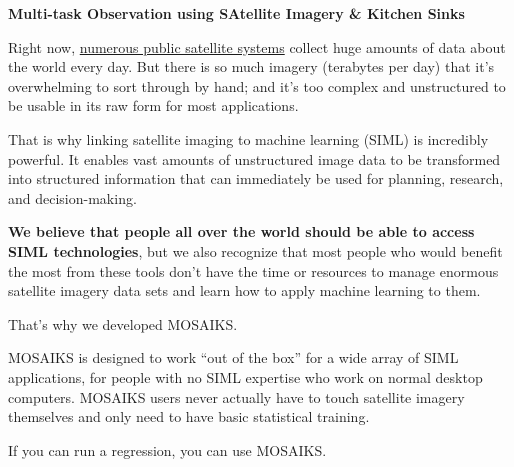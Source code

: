 \documentclass[
  letterpaper,
  DIV=11,
  numbers=noendperiod]{scrreprt}
\begin{document}
\begin{tcolorbox}[enhanced jigsaw, bottomtitle=1mm, rightrule=.15mm, coltitle=black, titlerule=0mm, toprule=.15mm, breakable, bottomrule=.15mm, left=2mm, leftrule=.75mm, opacitybacktitle=0.6, colbacktitle=quarto-callout-tip-color!10!white, arc=.35mm, opacityback=0, title=\textcolor{quarto-callout-tip-color}{\faLightbulb}\hspace{0.5em}{MOSAIKS}, toptitle=1mm, colback=white, colframe=quarto-callout-tip-color-frame]

\textbf{Multi-task Observation using SAtellite Imagery \& Kitchen Sinks}

\end{tcolorbox}

Right now,
\href{https://www.ucsusa.org/resources/satellite-database\#.VF_jIlPF8Wg}{numerous
public satellite systems} collect huge amounts of data about the world
every day. But there is so much imagery (terabytes per day) that it's
overwhelming to sort through by hand; and it's too complex and
unstructured to be usable in its raw form for most applications.

That is why linking satellite imaging to machine learning (SIML) is
incredibly powerful. It enables vast amounts of unstructured image data
to be transformed into structured information that can immediately be
used for planning, research, and decision-making.

\textbf{We believe that people all over the world should be able to
access SIML technologies}, but we also recognize that most people who
would benefit the most from these tools don't have the time or resources
to manage enormous satellite imagery data sets and learn how to apply
machine learning to them.

That's why we developed MOSAIKS.

MOSAIKS is designed to work ``out of the box'' for a wide array of SIML
applications, for people with no SIML expertise who work on normal
desktop computers. MOSAIKS users never actually have to touch satellite
imagery themselves and only need to have basic statistical training.

\begin{tcolorbox}[enhanced jigsaw, left=2mm, rightrule=.15mm, leftrule=.75mm, arc=.35mm, opacityback=0, breakable, colback=white, toprule=.15mm, bottomrule=.15mm]

If you can run a regression, you can use MOSAIKS.

\end{tcolorbox}
\end{document}

